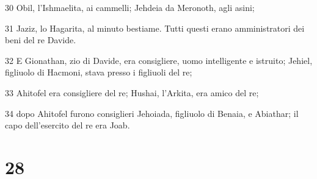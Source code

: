 \par 30 Obil, l'Ishmaelita, ai cammelli; Jehdeia da Meronoth, agli asini;
\par 31 Jaziz, lo Hagarita, al minuto bestiame. Tutti questi erano amministratori dei beni del re Davide.
\par 32 E Gionathan, zio di Davide, era consigliere, uomo intelligente e istruito; Jehiel, figliuolo di Hacmoni, stava presso i figliuoli del re;
\par 33 Ahitofel era consigliere del re; Hushai, l'Arkita, era amico del re;
\par 34 dopo Ahitofel furono consiglieri Jehoiada, figliuolo di Benaia, e Abiathar; il capo dell'esercito del re era Joab.

\chapter{28}

